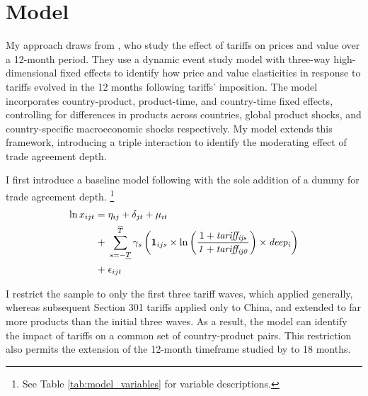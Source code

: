 \section{Model}\label{sec:dynamic_model}

My approach draws from \textcite{amiti_whos_2020}, who study the effect of tariffs on prices and value over a 12-month period. They use a dynamic event study model with three-way high-dimensional fixed effects to identify how price and value elasticities in response to tariffs evolved in the 12 months following tariffs’ imposition. The model incorporates country-product, product-time, and country-time fixed effects, controlling for differences in products across countries, global product shocks, and country-specific macroeconomic shocks respectively. My model extends this framework, introducing a triple interaction to identify the moderating effect of trade agreement depth.

I first introduce a baseline model following \textcite{amiti_whos_2020} with the sole addition of a dummy for trade agreement depth. \footnote{See Table \ref{tab:model_variables} for variable descriptions.}
    \begin{align}
        \ln x_{ijt} = \; & \eta_{ij} + \delta_{jt} + \mu_{it} \notag \\
        + \; & \sum_{s = -\underline{T}}^{\overline{T}} \gamma_s \left( \mathbf{1}_{ijs} \times \ln \left( \frac{1 + \mathit{tariff_{ijs}}}{\mathit{1 +  tariff_{ij0}}} \right) \times \mathit{deep_{i}} \right) \notag \\
        + \; & \epsilon_{ijt}
    \end{align}

I restrict the sample to only the first three tariff waves, which applied generally, whereas subsequent Section 301 tariffs applied only to China, and extended to far more products than the initial three waves. As a result, the model can identify the impact of tariffs on a common set of country-product pairs. This restriction also permits the extension of the 12-month timeframe studied by \textcite{amiti_whos_2020} to 18 months. 

